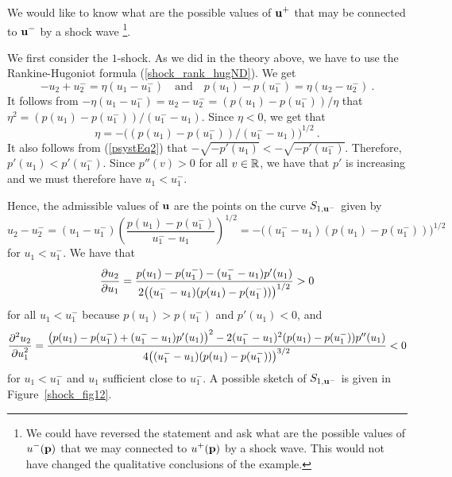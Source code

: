 \begin{egg}
We would like to know what are the possible values of
$\displaystyle \mathbf{u}^+$ that may be connected to
$\displaystyle \mathbf{u}^-$ by a shock wave
\footnote{We could have reversed the statement and ask what are the
possible values of $\displaystyle u^-(\mathbf{p})$ that we may connected to
$\displaystyle u^+(\mathbf{p})$ by a shock wave.  This would not have changed the
qualitative conclusions of the example.}.

 We first consider the $1$-shock.  As we did in the
theory above, we have to use the Rankine-Hugoniot formula
(\ref{shock_rank_hugND}).  We get
\begin{equation} \label{psystEq4}
-u_2 + u^-_2 = \eta ( u_1 - u^-_1) \quad \text{and} 
\quad p(u_1) - p(u^-_1) = \eta ( u_2 - u^-_2 ) \ .
\end{equation}
It follows from
$\displaystyle -\eta ( u_1 - u^-_1) = u_2 - u^-_2 = (p(u_1) - p(u^-_1))/\eta$
that $\displaystyle \eta^2 = (p(u_1) - p(u^-_1))/(u^-_1 - u_1)$.
Since $\eta < 0$, we get that
\begin{equation}  \label{psystEq7}
\eta = - \big((p(u_1) - p(u^-_1))/(u^-_1 - u_1)\big)^{1/2} \ .
\end{equation}
It also follows from (\ref{psystEq2}) that
$-\sqrt{-p'(u_1)} < -\sqrt{-p'(u^-_1)}$.  Therefore,
$\displaystyle p'(u_1) < p'(u^-_1)$.  Since
$p''(v) > 0$ for all $v \in \mathbb{R}$, we have that $p'$ is increasing and
we must therefore have $\displaystyle u_1 < u^-_1$.

Hence, the admissible values of $\mathbf{u}$ are the points on the curve
$S_{1,\mathbf{u}^-}$ given by
\[
u_2 - u^-_2 = ( u_1 - u^-_1)
\left(\frac{p(u_1) - p(u^-_1)}{u^-_1 - u_1}\right)^{1/2}
= -\big( (u^-_1 - u_1) (p(u_1) - p(u^-_1)) \big)^{1/2}
\]
for $\displaystyle u_1 < u^-_1$.  We have that
\[
\frac{\partial{u_2}}{\partial u_1} = \frac{p(u_1) - p(u^-_1) - (u^-_1 - u_1)p'(u_1)}
{2\big( (u^-_1 - u_1) (p(u_1) - p(u^-_1)) \big)^{1/2}} > 0
\]
for all $\displaystyle u_1 < u^-_1$ because
$\displaystyle p(u_1) > p(u^-_1)$ and $p'(u_1)<0$, and
\[
\frac{\displaystyle \partial^{2}{u_2}} {\displaystyle \partial u_1^{2}} = 
\frac{\big(p(u_1) - p(u^-_1) + (u^-_1 - u_1)p'(u_1)\big)^2
- 2 (u^-_1-u_1)^2 (p(u_1) - p(u^-_1)) p''(u_1)}
{4\big((u^-_1 - u_1)(p(u_1)-p(u^-_1))\big)^{3/2}}
< 0
\]
for $\displaystyle u_1 < u^-_1$ and $u_1$ sufficient close to
$\displaystyle u^-_1$.  A possible
sketch of $S_{1,\mathbf{u}^-}$ is given in Figure~\ref{shock_fig12}.


\end{egg}
